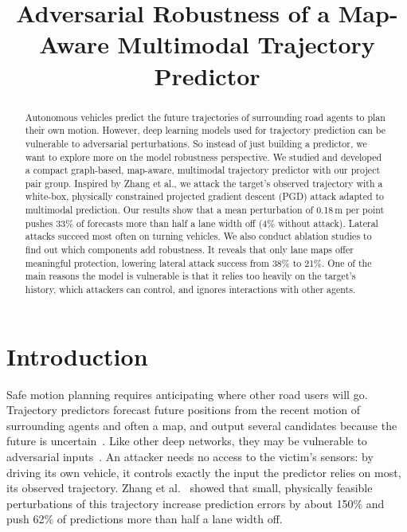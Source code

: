 \documentclass[conference]{IEEEtran}
\begin{document}
\title{Adversarial Robustness of a Map-Aware Multimodal Trajectory Predictor}

\author{
}

\maketitle

\begin{abstract}
Autonomous vehicles predict the future trajectories of surrounding road agents to plan their own motion. However, deep learning models used for trajectory prediction can be vulnerable to adversarial perturbations. So instead of just building a predictor, we want to explore more on the model robustness perspective. We studied and developed a compact graph-based, map-aware, multimodal trajectory predictor with our project pair group. Inspired by Zhang et al., we attack the target's observed trajectory with a white-box, physically constrained projected gradient descent (PGD) attack adapted to multimodal prediction. Our results show that a mean perturbation of 0.18\,m per point pushes 33\% of forecasts more than half a lane width off (4\% without attack). Lateral attacks succeed most often on turning vehicles. We also conduct ablation studies to find out which components add robustness. It reveals that only lane maps offer meaningful protection, lowering lateral attack success from 38\% to 21\%. One of the main reasons the model is vulnerable is that it relies too heavily on the target's history, which attackers can control, and ignores interactions with other agents.
\end{abstract}

\section{Introduction}
Safe motion planning requires anticipating where other road users will go. Trajectory predictors forecast future positions from the recent motion of surrounding agents and often a map, and output several candidates because the future is uncertain~\cite{cui2019multimodal}. Like other deep networks, they may be vulnerable to adversarial inputs~\cite{goodfellow2015explaining}. An attacker needs no access to the victim's sensors: by driving its own vehicle, it controls exactly the input the predictor relies on most, its observed trajectory. Zhang et al.~\cite{zhang2022adversarial} showed that small, physically feasible perturbations of this trajectory increase prediction errors by about 150\% and push 62\% of predictions more than half a lane width off.
\end{document}
